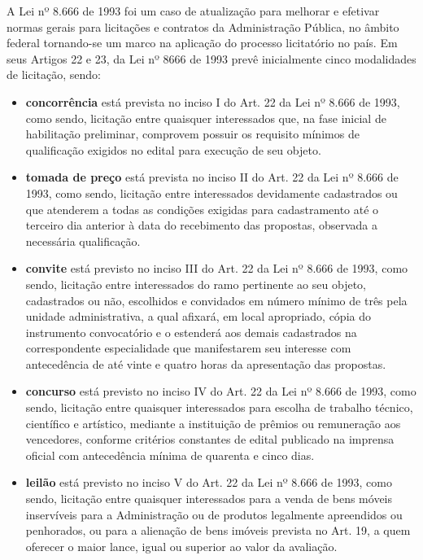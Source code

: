 A Lei nº 8.666 de 1993 foi um caso de atualização para melhorar e efetivar normas gerais para licitações e contratos da Administração Pública, no âmbito federal tornando-se um marco na aplicação do processo licitatório no país.
Em seus Artigos 22 e 23, da Lei nº 8666 de 1993 prevê inicialmente cinco modalidades de licitação, sendo:

\begin{itemize}
    \item \textbf{concorrência} está prevista no inciso I do Art. 22 da Lei nº 8.666 de 1993, como sendo, licitação entre quaisquer interessados que, na fase inicial de habilitação preliminar, comprovem possuir os requisito mínimos de qualificação exigidos no edital para execução de seu objeto.

    \item \textbf{tomada de preço} está prevista no inciso II do Art. 22 da Lei nº 8.666 de 1993, como sendo, licitação entre interessados devidamente cadastrados ou que atenderem a todas as condições exigidas para cadastramento até o terceiro dia anterior à data do recebimento das propostas, observada a necessária qualificação.

    \item \textbf{convite} está previsto no inciso III do Art. 22 da Lei nº 8.666 de 1993, como sendo, licitação entre interessados do ramo pertinente ao seu objeto, cadastrados ou não, escolhidos e convidados em número mínimo de três pela unidade administrativa, a qual afixará, em local apropriado, cópia do instrumento convocatório e o estenderá aos demais cadastrados na correspondente especialidade que manifestarem seu interesse com antecedência de até vinte e quatro horas da apresentação das propostas. 

    \item \textbf{concurso} está previsto no inciso IV do Art. 22 da Lei nº 8.666 de 1993, como sendo, licitação entre quaisquer interessados para escolha de trabalho técnico, científico e artístico, mediante a instituição de prêmios ou remuneração aos vencedores, conforme critérios constantes de edital publicado na imprensa oficial com antecedência mínima de quarenta e cinco dias. 

    \item \textbf{leilão} está previsto no inciso V do Art. 22 da Lei nº 8.666 de 1993, como sendo, licitação entre quaisquer interessados para a venda de bens móveis inservíveis para a Administração ou de produtos legalmente apreendidos ou penhorados, ou para a alienação de bens imóveis prevista no Art. 19, a quem oferecer o maior lance, igual ou superior ao valor da avaliação. 
\end{itemize}

